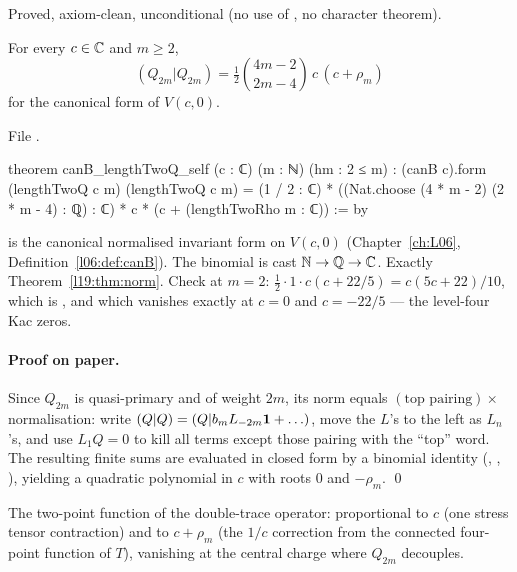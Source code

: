 \begin{status}
Proved, axiom-clean, unconditional (no use of , no character theorem).
\end{status}

\begin{theorem}\label{l19:thm:norm}
For every $c\in{\mathbb{C}}$ and $m\ge2$,
\begin{equation*}
 (Q_{2m}|Q_{2m}) = \tfrac12\binom{4m-2}{2m-4}\,c\,(c+\rho_m)
\end{equation*}
for the canonical form of $V(c,0)$.
\end{theorem}

\noindent File .
\begin{leancode}
theorem canB_lengthTwoQ_self (c : ℂ) (m : ℕ) (hm : 2 ≤ m) :
    (canB c).form (lengthTwoQ c m) (lengthTwoQ c m) =
      (1 / 2 : ℂ) * ((Nat.choose (4 * m - 2) (2 * m - 4) : ℚ) : ℂ) * c *
        (c + (lengthTwoRho m : ℂ)) := by
\end{leancode}

\begin{dictionary}
 is the canonical normalised invariant form on $V(c,0)$ (Chapter~\ref{ch:L06},
Definition~\ref{l06:def:canB}). The binomial is cast ${\mathbb{N}}\to{\mathbb{Q}}\to{\mathbb{C}}$. Exactly Theorem~\ref{l19:thm:norm}.
Check at $m=2$: $\tfrac12\cdot1\cdot c(c+22/5) = c(5c+22)/10$, which is
\allowbreak{}\allowbreak{}\allowbreak{}\allowbreak{}, and which vanishes exactly at $c=0$ and $c=-22/5$ --- the
level-four Kac zeros.
\end{dictionary}

\paragraph{Proof on paper.} Since $Q_{2m}$ is quasi-primary and of weight $2m$, its norm equals
$(\text{top pairing})\times$normalisation: write $(Q|Q) = (Q|b_mL_{-2m}\mathbf{1} + \ldots)$, move the
$L$'s to the left as $L_n$'s, and use $L_1Q=0$ to kill all terms except those pairing with the
``top'' word. The resulting finite sums are evaluated in closed form by a binomial identity
(\allowbreak{}\allowbreak{}, , ),
yielding a quadratic polynomial in $c$ with roots $0$ and $-\rho_m$. \qed

\begin{physics}
The two-point function of the double-trace operator: proportional to $c$ (one stress tensor
contraction) and to $c+\rho_m$ (the $1/c$ correction from the connected four-point function of $T$),
vanishing at the central charge where $Q_{2m}$ decouples.
\end{physics}


